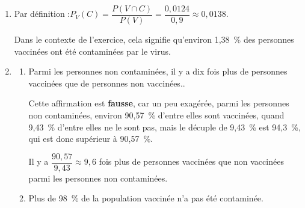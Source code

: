 \documentclass[10pt]{article}
\begin{document}
\begin{enumerate}
\hfill~

\item Par définition :\quad $P_V(C) = \dfrac{P(V \cap C)}{P(V)} = \dfrac{0,0124}{0,9} \approx 0,0138$.

Dans le contexte de l'exercice, cela signifie qu'environ 1,38~\% des personnes vaccinées ont été contaminées par le virus.

\item
	\begin{enumerate}
		\item \og Parmi les personnes non contaminées, il y a dix fois plus de personnes vaccinées que de personnes non vaccinées.\fg{}.

Cette affirmation est \textbf{fausse}, car un peu exagérée, parmi les personnes non contaminées, environ 90,57~\% d'entre elles sont vaccinées, quand 9,43~\% d'entre elles ne le sont pas, mais le décuple de 9,43~\% est 94,3~\%, qui est donc supérieur à 90,57~\%.

Il y a $\dfrac{90,57}{9,43}\approx 9,6$ fois plus de personnes vaccinées que non vaccinées parmi les personnes non contaminées.

		\item \og Plus de 98~\% de la population vaccinée n'a pas été contaminée.\fg{}


\end{enumerate}
\end{enumerate}
\end{document}
